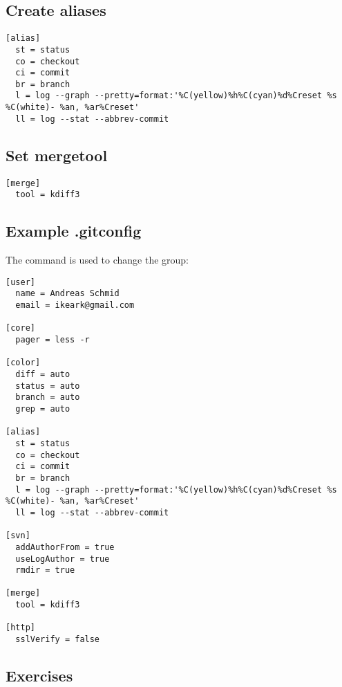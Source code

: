 \subsection{Create aliases}
\begin{frame}[fragile]
  \subslidetitle

\begin{lstlisting}
[alias]
  st = status
  co = checkout
  ci = commit
  br = branch
  l = log --graph --pretty=format:'%C(yellow)%h%C(cyan)%d%Creset %s %C(white)- %an, %ar%Creset'
  ll = log --stat --abbrev-commit
\end{lstlisting}
\end{frame}

\subsection{Set mergetool}
\begin{frame}[fragile]
  \subslidetitle
\begin{lstlisting}
[merge]
  tool = kdiff3
\end{lstlisting}
\end{frame}

\subsection{Example .gitconfig}
\begin{frame}[fragile]
  \subslidetitle
  The command  is used to change the group:


\begin{lstlisting}
[user]
  name = Andreas Schmid
  email = ikeark@gmail.com

[core]
  pager = less -r

[color]
  diff = auto
  status = auto
  branch = auto
  grep = auto

[alias]
  st = status
  co = checkout
  ci = commit
  br = branch
  l = log --graph --pretty=format:'%C(yellow)%h%C(cyan)%d%Creset %s %C(white)- %an, %ar%Creset'
  ll = log --stat --abbrev-commit

[svn]
  addAuthorFrom = true
  useLogAuthor = true
  rmdir = true

[merge]
  tool = kdiff3

[http]
  sslVerify = false
\end{lstlisting}
\end{frame}

\subsection{Exercises}
\begin{frame}[fragile]
  \subslidetitle
\end{frame}
